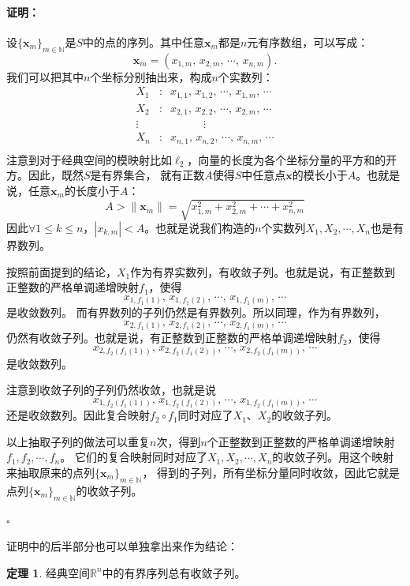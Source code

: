 \documentclass[12pt,UTF8]{ctexbook}
\theoremstyle{definition}
\newtheorem{tm}{定理}[section]
\theoremstyle{plain}
\renewenvironment{proof}{\paragraph{\textbf{证明：}}}{\hfill$\square$}
\begin{document}
\begin{appendix}
\begin{proof}
    设$\{\mathbf{x}_m\}_{m\in\mathbb{N}}$是$S$中的点的序列。其中任意$\mathbf{x}_m$都是$n$元有序数组，可以写成：
    $$ \mathbf{x}_m = (x_{1,m},\, x_{2,m},\,\cdots, \, x_{n,m}). $$
    我们可以把其中$n$个坐标分别抽出来，构成$n$个实数列：
    \begin{align*}
        X_1 &:\;\; x_{1,1}, \, x_{1,2},\, \cdots, \, x_{1,m}, \, \cdots \\
        X_2 &:\;\; x_{2,1}, \, x_{2,2},\, \cdots, \, x_{2,m}, \, \cdots \\
        \vdots& \qquad \qquad \vdots \\
        X_n &:\;\; x_{n,1}, \, x_{n,2},\, \cdots, \, x_{n,m}, \, \cdots \\
    \end{align*}
    注意到对于经典空间的模映射比如$\ell_2$，向量的长度为各个坐标分量的平方和的开方。因此，既然$S$是有界集合，
    就有正数$A$使得$S$中任意点$\mathbf{x}$的模长小于$A$。也就是说，任意$\mathbf{x}_m$的长度小于$A$：
    $$ A > \| \mathbf{x}_m \| = \sqrt{x_{1,m}^2 +  x_{2,m}^2 + \cdots + x_{n,m}^2}$$
    因此$\forall 1\leqslant k \leqslant n$，$|x_{k,m}| < A$。也就是说我们构造的$n$个实数列$X_1,X_2,\cdots,X_n$也是有界数列。

    按照前面提到的结论，$X_1$作为有界实数列，有收敛子列。也就是说，有正整数到正整数的严格单调递增映射$f_1$，使得
    $$ x_{1,f_1(1)}, \, x_{1,f_1(2)},\, \cdots, \, x_{1,f_1(m)}, \, \cdots $$
    是收敛数列。
    而有界数列的子列仍然是有界数列。所以同理，作为有界数列，
    $$ x_{2,f_1(1)}, \, x_{2,f_1(2)},\, \cdots, \, x_{2,f_1(m)}, \, \cdots $$
    仍然有收敛子列。也就是说，有正整数到正整数的严格单调递增映射$f_2$，使得
    $$ x_{2,f_2(f_1(1))}, \, x_{2,f_2(f_1(2))},\, \cdots, \, x_{2,f_2(f_1(m))}, \, \cdots $$
    是收敛数列。

    注意到收敛子列的子列仍然收敛，也就是说
    $$ x_{1,f_2(f_1(1))}, \, x_{1,f_2(f_1(2))},\, \cdots, \, x_{1,f_2(f_1(m))}, \, \cdots $$
    还是收敛数列。因此复合映射$f_2\circ f_1$同时对应了$X_1$、$X_2$的收敛子列。

    以上抽取子列的做法可以重复$n$次，得到$n$个正整数到正整数的严格单调递增映射$f_1, f_2, \cdots ,f_n$。
    它们的复合映射同时对应了$X_1,X_2,\cdots,X_n$的收敛子列。用这个映射来抽取原来的点列$\{\mathbf{x}_m\}_{m\in\mathbb{N}}$，
    得到的子列，所有坐标分量同时收敛，因此它就是点列$\{\mathbf{x}_m\}_{m\in\mathbb{N}}$的收敛子列。

\end{proof}

证明中的后半部分也可以单独拿出来作为结论：
\begin{tm}
    经典空间$\mathbb{R}^n$中的有界序列总有收敛子列。
\end{tm}


\end{appendix}
\end{document}
